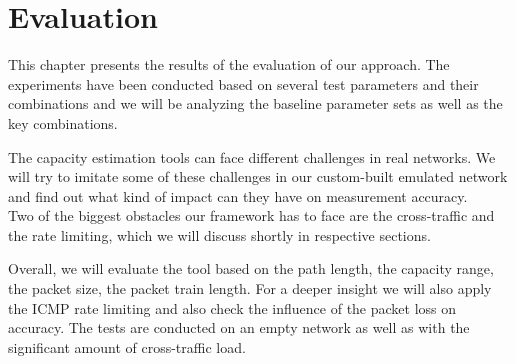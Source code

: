 \chapter{Evaluation}
This chapter presents the results of the evaluation of our approach. The experiments have been conducted based on several test parameters and their combinations and we will be analyzing the baseline parameter sets as well as the key combinations. 

The capacity estimation tools can face different challenges in real networks. We will try to imitate some of these challenges in our custom-built emulated network and find out what kind of impact can they have on measurement accuracy.\\
Two of the biggest obstacles our framework has to face are the cross-traffic and the  rate limiting, which we will discuss shortly in respective sections.

Overall, we will evaluate the tool based on the path length, the capacity range, the packet size, the packet train length. For a deeper insight we will also apply the ICMP rate limiting and also check the influence of the packet loss on accuracy. 
The tests are conducted on an empty network as well as with the significant amount of cross-traffic load.

